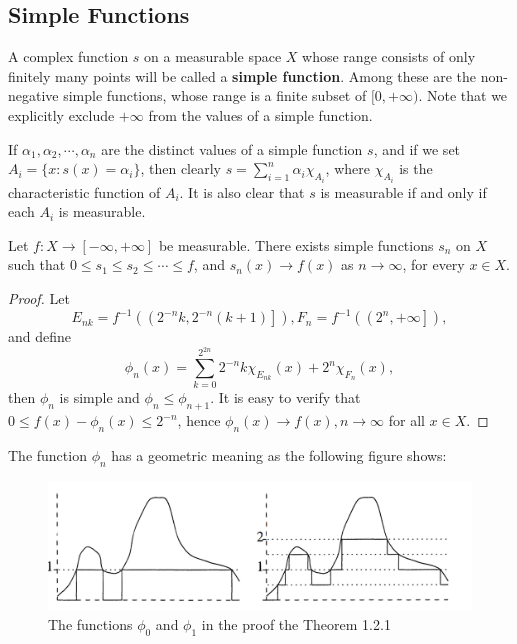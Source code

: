 \subsection{Simple Functions}
A complex function $s$ on a measurable space $X$ whose range consists of only finitely many points will be called a \textbf{simple function}. Among these are the non-negative simple functions, whose range is a finite subset of $[0,+\infty)$. Note that we explicitly exclude $+\infty$ from the values of a simple function.\par
If $\alpha_1,\alpha_2,\cdots,\alpha_n$ are the distinct values of a simple function $s$, and if we set $A_i=\{x:s(x)=\alpha_i\}$, then clearly $s=\sum_{i=1}^n\alpha_i\chi_{A_i}$, where $\chi_{A_i}$ is the characteristic function of $A_i$. It is also clear that $s$ is measurable if and only if each $A_i$ is measurable.
\begin{theorem}
Let $f:X\to[-\infty,+\infty]$ be measurable. There exists simple functions $s_n$ on $X$ such that $0\le s_1\le s_2\le\cdots\le f$, and $s_n(x)\to f(x)$ as $n\to\infty$, for every $x\in X$.
\end{theorem}
\begin{proof}
Let 
$$
E_{nk}=f^{-1}\left( \left( 2^{-n}k,2^{-n}\left( k+1 \right) \right] \right) ,F_n=f^{-1}\left( \left( 2^n,+\infty \right] \right) ,
$$
and define 
$$
\phi _n\left( x \right) =\sum_{k=0}^{2^{2n}}{2^{-n}k\chi _{E_{nk}}\left( x \right)}+2^n\chi _{F_n}\left( x \right) ,
$$
then $\phi_n$ is simple and $\phi_n\le\phi_{n+1}$. It is easy to verify that $0\le f\left( x \right) -\phi _n\left( x \right) \le 2^{-n}$, hence $\phi _n\left( x \right) \rightarrow f\left( x \right) ,n\rightarrow \infty $ for all $x\in X$.
\end{proof}
The function $\phi_n$ has a geometric meaning as the following figure shows:
\begin{figure}[htbp]
    \center
    \includegraphics[scale=0.19]{img/simple function.png}
    \caption{The functions $\phi_0$ and $\phi_1$ in the proof the Theorem 1.2.1}
\end{figure}
